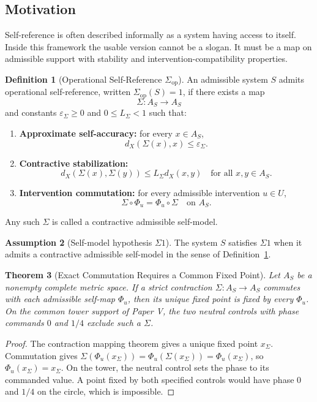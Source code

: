 \documentclass[11pt,a4paper]{article}
\newtheorem{theorem}{Theorem}[section]
\theoremstyle{definition}
\newtheorem{definition}[theorem]{Definition}
\newtheorem{assumption}[theorem]{Assumption}
\newcommand{\Sigmaop}{\Sigma_{\mathrm{op}}}
\newcommand{\Aset}{A_S}
\newcommand{\eps}{\varepsilon}
\begin{document}
\subsection{Motivation}
Self-reference is often described informally as a system having access to itself. Inside this framework the usable version cannot be a slogan. It must be a map on admissible support with stability and intervention-compatibility properties.

\begin{definition}[Operational Self-Reference $\Sigmaop$]\label{def:sigma-op}
An admissible system $S$ admits operational self-reference, written $\Sigmaop(S)=1$, if there exists a map
\[
\Sigma:\Aset\to\Aset
\]
and constants $\eps_\Sigma\ge 0$ and $0\le L_\Sigma<1$ such that:
\begin{enumerate}[leftmargin=1.5em]
\item \textbf{Approximate self-accuracy:} for every $x\in\Aset$,
\[
d_X(\Sigma(x),x)\le \eps_\Sigma.
\]
\item \textbf{Contractive stabilization:}
\[
d_X(\Sigma(x),\Sigma(y))\le L_\Sigma d_X(x,y)
\quad\text{for all }x,y\in\Aset.
\]
\item \textbf{Intervention commutation:} for every admissible intervention $u\in U$,
\[
\Sigma\circ \Phi_u = \Phi_u\circ \Sigma
\quad\text{on }\Aset.
\]
\end{enumerate}
Any such $\Sigma$ is called a contractive admissible self-model.
\end{definition}

\begin{assumption}[Self-model hypothesis $\Sigma1$]\label{ass:sigma1}
The system $S$ satisfies $\Sigma1$ when it admits a contractive admissible self-model in the sense of Definition~\ref{def:sigma-op}.
\end{assumption}

\begin{theorem}[Exact Commutation Requires a Common Fixed Point]\label{thm:sigma-common-fixed-point}
Let $\Aset$ be a nonempty complete metric space. If a strict contraction $\Sigma:\Aset\to\Aset$ commutes with each admissible self-map $\Phi_u$, then its unique fixed point is fixed by every $\Phi_u$. On the common tower support of Paper V, the two neutral controls with phase commands $0$ and $1/4$ exclude such a $\Sigma$.
\end{theorem}
\begin{proof}
The contraction mapping theorem gives a unique fixed point $x_\Sigma$. Commutation gives $\Sigma(\Phi_u(x_\Sigma))=\Phi_u(\Sigma(x_\Sigma))=\Phi_u(x_\Sigma)$, so $\Phi_u(x_\Sigma)=x_\Sigma$. On the tower, the neutral control sets the phase to its commanded value. A point fixed by both specified controls would have phase $0$ and $1/4$ on the circle, which is impossible.
\end{proof}
\end{document}
